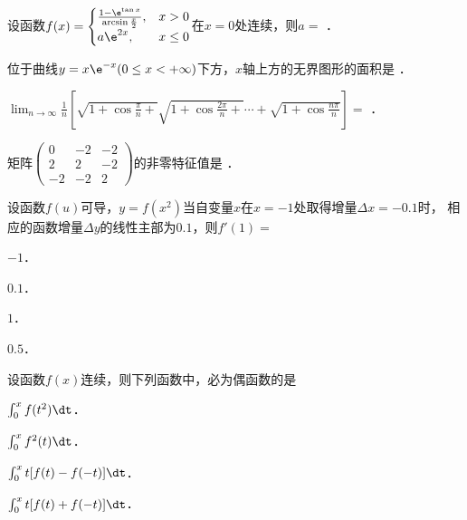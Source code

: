 \documentclass[plain,noanswer,medmath]{../../template/jnuexam}
\begin{document}






\begin{problem}
设函数$f(x) = \begin{cases}
  \frac{1 - \e^{\tan x}}{\arcsin \frac{x}{2}},& x > 0 \\
  a\e^{2x}, & x \le 0
\end{cases}$在$x = 0$处连续，则$a =$ \fillin{}．
\end{problem}


\begin{problem}
位于曲线$y = x\e^{- x}(0 \le x < +\infty)$下方，$x$轴上方的无界图形的面积是 \fillin{}．
\end{problem}




\begin{problem}
$\lim_{n \to \infty} \frac{1}{n}\left[\sqrt{1 + \cos \frac{\pi}{n} +} \sqrt{1 + \cos \frac{2\pi}{n} +}
  \cdots + \sqrt{1 + \cos \frac{n\pi}{n}} \right] =$ \fillin{}．
\end{problem}


\begin{problem}
矩阵$\begin{pmatrix}
   0 & -2 & -2 \\
   2 &  2 & -2 \\
  -2 & -2 & 2
\end{pmatrix}$的非零特征值是 \fillin{}．
\end{problem}




\begin{problem}
设函数$f(u)$可导，$y = f(x^2)$当自变量$x$在$x = - 1$处取得增量$\Delta x = - 0.1$时，
相应的函数增量$\Delta y$的线性主部为$0.1$，则$f'(1) =$\pickout{}
\begin{abcd}
\item $-1$．
\item $0.1$．
\item $1$．
\item $0.5$．
\end{abcd}
\end{problem}


\begin{problem}
设函数$f(x)$连续，则下列函数中，必为偶函数的是\pickout{}
\begin{abcd}
\item $\int_0^x f(t^2) \dt$．
\item $\int_0^x f^2(t) \dt$．
\item $\int_0^x t[f(t) - f(- t)]\dt$．
\item $\int_0^x t[f(t) + f(- t)]\dt$．
\end{abcd}
\end{problem}
\end{document}
